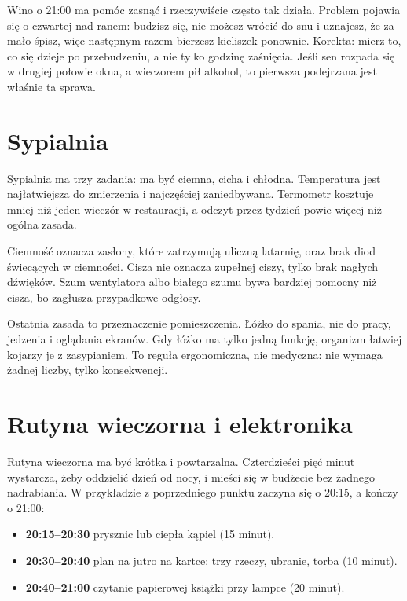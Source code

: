 \begin{falle}
Wino o 21:00 ma pomóc zasnąć i rzeczywiście często tak działa. Problem pojawia się o czwartej nad ranem: budzisz się, nie możesz wrócić do snu i uznajesz, że za mało śpisz, więc następnym razem bierzesz kieliszek ponownie. Korekta: mierz to, co się dzieje po przebudzeniu, a nie tylko godzinę zaśnięcia. Jeśli sen rozpada się w drugiej połowie okna, a wieczorem pił alkohol, to pierwsza podejrzana jest właśnie ta sprawa.
\end{falle}

\section{Sypialnia}

Sypialnia ma trzy zadania: ma być ciemna, cicha i chłodna. Temperatura jest najłatwiejsza do zmierzenia i najczęściej zaniedbywana.  Termometr kosztuje mniej niż jeden wieczór w restauracji, a odczyt przez tydzień powie więcej niż ogólna zasada.

Ciemność oznacza zasłony, które zatrzymują uliczną latarnię, oraz brak diod świecących w ciemności. Cisza nie oznacza zupełnej ciszy, tylko brak nagłych dźwięków. Szum wentylatora albo białego szumu bywa bardziej pomocny niż cisza, bo zagłusza przypadkowe odgłosy. 

Ostatnia zasada to przeznaczenie pomieszczenia. Łóżko do spania, nie do pracy, jedzenia i oglądania ekranów. Gdy łóżko ma tylko jedną funkcję, organizm łatwiej kojarzy je z zasypianiem. To reguła ergonomiczna, nie medyczna: nie wymaga żadnej liczby, tylko konsekwencji.

\section{Rutyna wieczorna i elektronika}

Rutyna wieczorna ma być krótka i powtarzalna. Czterdzieści pięć minut wystarcza, żeby oddzielić dzień od nocy, i mieści się w budżecie bez żadnego nadrabiania. W przykładzie z poprzedniego punktu zaczyna się o 20:15, a kończy o 21:00:

\begin{itemize}
\item \textbf{20:15--20:30} prysznic lub ciepła kąpiel (15 minut). 
\item \textbf{20:30--20:40} plan na jutro na kartce: trzy rzeczy, ubranie, torba (10 minut).
\item \textbf{20:40--21:00} czytanie papierowej książki przy lampce (20 minut).
\end{itemize}

